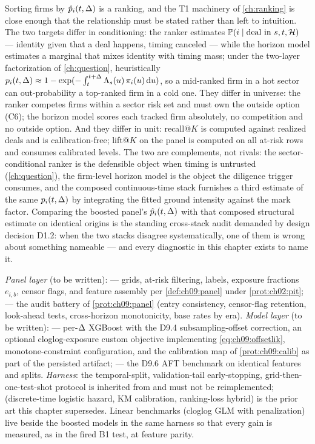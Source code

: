 Sorting firms by $\hat p_i(t, \Delta)$ is a ranking, and the T1
machinery of \cref{ch:ranking} is close enough that the relationship
must be stated rather than left to intuition. The two targets differ in
conditioning: the ranker estimates $\mathbb{P}(i \mid \text{deal in } s, t,
\mathcal{H})$ --- identity given that a deal happens, timing canceled ---
while the horizon model estimates a marginal that mixes identity with
timing mass; under the two-layer factorization of
\cref{ch:question}, heuristically $p_i(t,\Delta) \approx 1 -
\exp(-\int_t^{t+\Delta} \Lambda_s(u)\, \pi_i(u) \,\mathrm{d} u)$, so a
mid-ranked firm in a hot sector can out-probability a top-ranked firm
in a cold one. They differ in universe: the ranker competes firms
within a sector risk set and must own the outside option (C6); the
horizon model scores each tracked firm absolutely, no competition and
no outside option. And they differ in unit: recall@$K$ is computed
against realized deals and is calibration-free; lift@$K$ on the panel
is computed on all at-risk rows and consumes calibrated levels. The two
are complements, not rivals: the sector-conditional ranker is the
defensible object when timing is untrusted (\cref{ch:question}), the
firm-level horizon model is the object the diligence trigger consumes,
and the composed continuous-time stack furnishes a third estimate of
the same $p_i(t,\Delta)$ by integrating the fitted ground intensity
against the mark factor. Comparing the boosted panel's
$\hat p_i(t,\Delta)$ with that composed structural estimate on
identical origins is the standing cross-stack audit demanded by design
decision D1.2: when the two stacks disagree systematically, one of them
is wrong about something nameable --- and every diagnostic in this
chapter exists to name it.

\begin{codehooks}
\emph{Panel layer} (to be written):  ---
grids, at-risk filtering, labels, exposure fractions $e_{i,b}$, censor
flags, and feature assembly per \cref{def:ch09:panel} under
\cref{prot:ch02:pit};  --- the audit battery of
\cref{prot:ch09:panel} (entry consistency, censor-flag retention,
look-ahead tests, cross-horizon monotonicity, base rates by era).
\emph{Model layer} (to be written):  ---
per-$\Delta$ XGBoost with the D9.4 subsampling-offset correction, an
optional cloglog-exposure custom objective implementing
\cref{eq:ch09:offsetlik}, monotone-constraint configuration, and the
calibration map of \cref{prot:ch09:calib} as part of the persisted
artifact;  --- the D9.6 AFT benchmark on
identical features and splits. \emph{Harness}: the temporal-split,
validation-tail early-stopping, grid-then-one-test-shot protocol is
inherited from  and must not
be reimplemented;  (discrete-time
logistic hazard, KM calibration, ranking-loss hybrid) is the prior art
this chapter supersedes. Linear benchmarks (cloglog GLM with
\citet{firth1993} penalization) live beside the boosted models in the
same harness so that every gain is measured, as in the fired B1 test,
at feature parity.
\end{codehooks}
